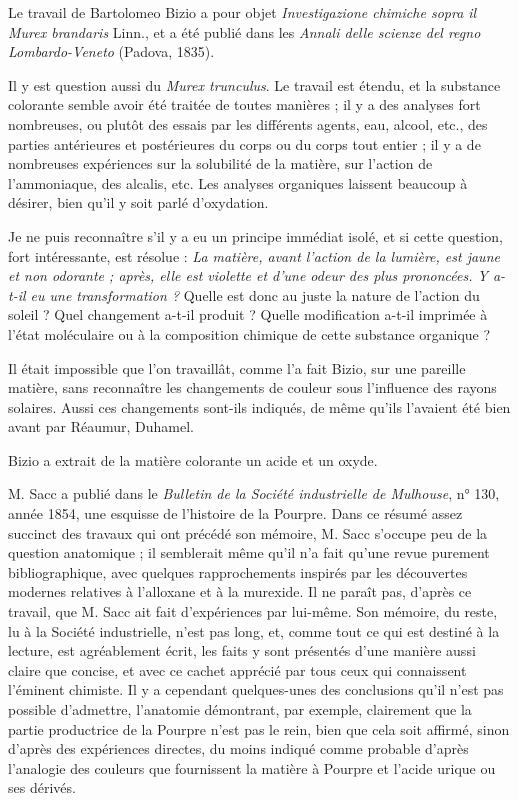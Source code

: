 \documentclass[a4paper, 11pt, oneside, polutonikogreek, french]{article}
\begin{document}
Le travail de Bartolomeo Bizio a pour objet \emph{Investigazione chimiche sopra il Murex brandaris} Linn., et a été publié dans les \emph{Annali delle scienze del regno Lombardo-Veneto} (Padova, 1835).

Il y est question aussi du \emph{Murex trunculus}. Le travail est étendu, et la substance colorante semble avoir été traitée de toutes manières ; il y a des analyses fort nombreuses, ou plutôt des essais par les différents agents, eau, alcool, etc., des parties antérieures et postérieures du corps ou du corps tout entier ; il y a de nombreuses expériences sur la solubilité de la matière, sur l'action de l'ammoniaque, des alcalis, etc. Les analyses organiques laissent beaucoup à désirer, bien qu'il y soit parlé d'oxydation.

Je ne puis reconnaître s'il y a eu un principe immédiat isolé, et si cette question, fort intéressante, est résolue : \emph{La matière, avant l'action de la lumière, est jaune et non odorante ; après, elle est violette et d'une odeur des plus prononcées. Y a-t-il eu une transformation ?} Quelle est donc au juste la nature de l'action du soleil ? Quel changement a-t-il produit ? Quelle modification a-t-il imprimée à l'état moléculaire ou à la composition chimique de cette substance organique ?

Il était impossible que l'on travaillât, comme l'a fait Bizio, sur une pareille matière, sans reconnaître les changements de couleur sous l'influence des rayons solaires. Aussi ces changements sont-ils indiqués, de même qu'ils l'avaient été bien avant par Réaumur, Duhamel.

Bizio a extrait de la matière colorante un acide et un oxyde.

M. Sacc a publié dans le \emph{Bulletin de la Société industrielle de Mulhouse}, n° 130, année 1854, une esquisse de l'histoire de la Pourpre. Dans ce résumé assez succinct des travaux qui ont précédé son mémoire, M. Sacc s'occupe peu de la question anatomique ; il semblerait même qu'il n'a fait qu'une revue purement bibliographique, avec quelques rapprochements inspirés par les découvertes modernes relatives à l'alloxane et à la murexide. Il ne paraît pas, d'après ce travail, que M. Sacc ait fait d'expériences par lui-même. Son mémoire, du reste, lu à la Société industrielle, n'est pas long, et, comme tout ce qui est destiné à la lecture, est agréablement écrit, les faits y sont présentés d'une manière aussi claire que concise, et avec ce cachet apprécié par tous ceux qui connaissent l'éminent chimiste. Il y a cependant quelques-unes des conclusions qu'il n'est pas possible d'admettre, l'anatomie démontrant, par exemple, clairement que la partie productrice de la Pourpre n'est pas le rein, bien que cela soit affirmé, sinon d'après des expériences directes, du moins indiqué comme probable d'après l'analogie des couleurs que fournissent la matière à Pourpre et l'acide urique ou ses dérivés.
\end{document}

